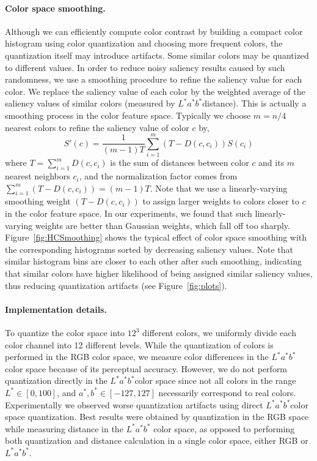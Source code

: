 \documentclass[10pt,twocolumn,letterpaper]{article}
\newcommand{\figref}[1]{Figure~\ref{#1}}
\newcommand{\Lab}{$L^*a^*b^*$}
\newcommand{\vnudge}{\vspace*{-.1in}}
\newcommand{\mypara}[1]{\paragraph{#1.}}
\begin{document}
\vnudge
\mypara{Color space smoothing}
Although we can efficiently compute color contrast by building a compact color histogram
using color quantization and choosing more frequent colors,
the quantization itself may introduce artifacts.
%
Some similar colors may be quantized to different values.
In order to reduce noisy saliency results caused by such randomness,
we use a smoothing procedure to refine the saliency value for each color.
%
We replace the saliency value of each color by the weighted average of the saliency
values of similar colors (measured by \Lab distance).
%
This is actually a smoothing process in the color feature space. Typically we choose
$m=n/4$ nearest colors to refine the saliency value of color $c$ by,
\begin{equation}\label{equ:smoothing}
    S'(c) = \frac{1}{(m-1)T} \sum_{i=1}^{m} (T-D(c, c_i))S(c_i)
\end{equation}
where $T=\sum_{i=1}^{m} D(c, c_i)$ is the sum of distances between color $c$ and its
$m$ nearest neighbors $c_i$, and the normalization factor comes from
    $\sum_{i=1}^{m} (T-D(c, c_i))=(m-1)T.$
%
Note that we use a linearly-varying smoothing weight $(T-D(c, c_i))$ to assign
larger weights to colors closer to $c$ in the color feature space.
%
In our experiments, we found that such linearly-varying weights are better than Gaussian
weights, which fall off too sharply.
%
\figref{fig:HCSmoothing} shows the typical effect of color space smoothing with the
corresponding histograms sorted by decreasing saliency values.
%
Note that similar histogram bins are closer to each other after such  smoothing,
indicating that similar colors have higher likelihood of being assigned similar saliency values,
thus reducing quantization artifacts (see \figref{fig:plots}).


\vnudge
\mypara{Implementation details}
To quantize the color space into $12^3$ different colors, we uniformly divide each color
channel into 12 different levels.
%
While the quantization of colors is performed in the RGB color space, we measure color
differences in the \Lab color space because of its perceptual accuracy.
%
However, we do not perform quantization directly in the \Lab color space since not all colors in
the range $L^*\in[0, 100]$, and $a^*, b^*\in[-127,127]$ necessarily correspond to real colors.
%
Experimentally we observed worse quantization artifacts using direct \Lab color space
quantization.
%
Best results were obtained by quantization in the RGB space while measuring distance in the \Lab
color space, as opposed to performing both quantization and distance calculation in a
single color space, either RGB or \Lab.
\end{document}
